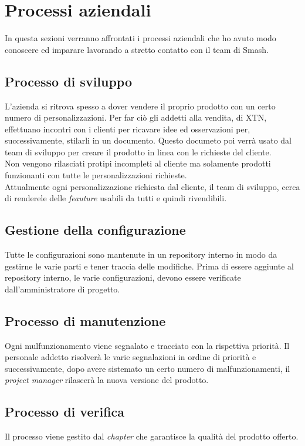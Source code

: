 \section{Processi aziendali}
In questa sezioni verranno affrontati i processi aziendali che ho avuto modo conoscere ed imparare lavorando a stretto contatto con il team di Smash\textregistered.
\subsection{Processo di sviluppo}
L'azienda si ritrova spesso a dover vendere il proprio prodotto con un certo numero di personalizzazioni. Per far ciò gli addetti alla vendita, di XTN, effettuano incontri con i clienti per ricavare idee ed osservazioni per, successivamente, stilarli in un documento. Questo documeto poi verrà usato dal team di sviluppo per creare il prodotto in linea con le richieste del cliente.\\
Non vengono rilasciati protipi incompleti al cliente ma solamente prodotti funzionanti con tutte le personalizzazioni richieste.\\
Attualmente ogni personalizzazione richiesta dal cliente, il team di sviluppo, cerca di renderele delle \textit{feauture} usabili da tutti e quindi rivendibili.\\
\subsection{Gestione della configurazione}
Tutte le configurazioni sono mantenute in un repository interno in modo da gestirne le varie parti e tener traccia delle modifiche. Prima di essere aggiunte al repository interno, le varie configurazioni, devono essere verificate dall'amministratore di progetto.
\subsection{Processo di manutenzione}
Ogni mulfunzionamento viene segnalato e tracciato con la rispettiva priorità. Il personale addetto risolverà le varie segnalazioni in ordine di priorità e successivamente, dopo avere sistemato un certo numero di malfunzionamenti, il \textit{project manager} rilascerà la nuova versione del prodotto.
\subsection{Processo di verifica}
Il processo viene gestito dal \textit{chapter} che garantisce la qualità del prodotto offerto.
